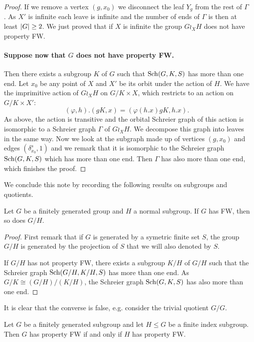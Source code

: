 \begin{proof}
If we remove a vertex $(g,x_0)$ we disconnect the leaf $Y_g$ from the rest of $\Gamma$. As $X'$ is infinite each leave is infinite and the number of ends of $\Gamma$ is then at least $\lvert G\rvert\geq 2$. We just proved that if $X$ is infinite the group $G\wr_XH$ does not have property FW.
%
%
%
\paragraph{Suppose now that $G$ does not have property FW.} Then there exists a subgroup $K$ of $G$ such that $\operatorname{Sch}(G,K,S)$ has more than one end.
Let $x_0$ be any point of $X$ and $X'$ be its orbit under the action of $H$.
We have the imprimitive action of $G\wr_XH$ on $G/K\times X$, which restricts to an action on $G/K\times X'$:
\[
	(\varphi,h).(gK,x) = (\varphi(h.x) gK, h.x).
\]
As above, the action is transitive and the orbital Schreier graph of this action is isomorphic to a Schreier graph $\Gamma$ of $G\wr_XH$. We decompose this graph into leaves in the same way. Now we look at the subgraph made up of vertices $(g,x_0)$ and edges $(\delta_{x_0}^s,1)$ and we remark that it is isomorphic to the Schreier graph $\operatorname{Sch}(G,K,S)$ which has more than one end. Then $\Gamma$ has also more than one end, which finishes the proof.
\end{proof}
%
%
We conclude this note by recording the following results on subgroups and quotients.
\begin{lem}
Let $G$ be a finitely generated group and $H$ a normal subgroup. If $G$ has FW, then so does $G/H$.
\end{lem}
%
\begin{proof}
First remark that if $G$ is generated by a symetric finite set $S$, the group $G/H$ is generated by the projection of $S$ that we will also denoted by $S$. 

If $G/H$ has not property FW, there exists a subgroup $K/H$ of $G/H$ such that the Schreier graph $\operatorname{Sch}(G/H, K/H,S)$ has more than one end. As $G/K \cong (G/H) / (K/H)$, the Schreier graph $\operatorname{Sch}(G,K,S)$ has also more than one end.
\end{proof}
It is clear that the converse is false, e.g. consider the trivial quotient $G/G$.

\begin{lem}
Let $G$ be a finitely generated subgroup and let $H\leq G$ be a finite index subgroup. Then $G$ has property FW if and only if $H$ has property FW.
\end{lem}

